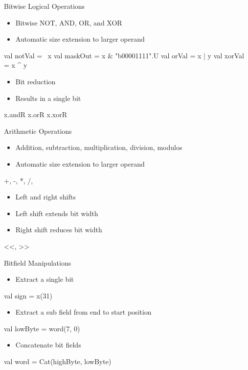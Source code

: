 \documentclass[xcolor=pdflatex,dvipsnames,table]{beamer}
\begin{document}
\begin{frame}[fragile]{Bitwise Logical Operations}
\begin{itemize}
\item Bitwise NOT, AND, OR, and XOR
\item Automatic size extension to larger operand
\end{itemize}
\begin{chisel}
val notVal = ~x
val maskOut = x & "b00001111".U
val orVal = x | y
val xorVal = x ^ y
\end{chisel}
\begin{itemize}
\item Bit reduction
\item Results in a single bit
\end{itemize}
\begin{chisel}
x.andR
x.orR
x.xorR
\end{chisel}
\end{frame}

\begin{frame}[fragile]{Arithmetic Operations}
\begin{itemize}
\item Addition, subtraction, multiplication, division, modulos
\item Automatic size extension to larger operand
\end{itemize}
\begin{chisel}
+, -, *, /, %
\end{chisel}
\begin{itemize}
\item Left and right shifts
\item Left shift extends bit width
\item Right shift reduces bit width
\end{itemize}
\begin{chisel}
<<, >>
\end{chisel}
\end{frame}

\begin{frame}[fragile]{Bitfield Manipulations}
\begin{itemize}
\item Extract a single bit
\end{itemize}
\begin{chisel}
val sign = x(31)
\end{chisel}
\begin{itemize}
\item Extract a sub field from end to start position
\end{itemize}
\begin{chisel}
val lowByte = word(7, 0)
\end{chisel}
\begin{itemize}
\item Concatenate bit fields
\end{itemize}
\begin{chisel}
val word = Cat(highByte, lowByte)
\end{chisel}
\end{frame}
\end{document}
